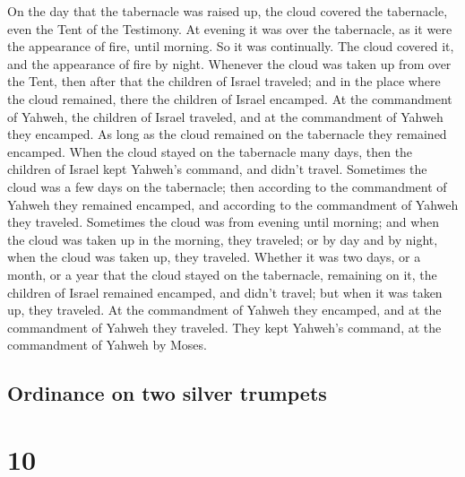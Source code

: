  On the day that the tabernacle was raised up, the cloud
covered the tabernacle, even the Tent of the Testimony. At evening it
was over the tabernacle, as it were the appearance of fire, until
morning.  So it was continually. The cloud covered it,
and the appearance of fire by night.  Whenever the cloud
was taken up from over the Tent, then after that the children of Israel
traveled; and in the place where the cloud remained, there the children
of Israel encamped.  At the commandment of Yahweh, the
children of Israel traveled, and at the commandment of Yahweh they
encamped. As long as the cloud remained on the tabernacle they remained
encamped.  When the cloud stayed on the tabernacle many
days, then the children of Israel kept Yahweh's command, and didn't
travel.  Sometimes the cloud was a few days on the
tabernacle; then according to the commandment of Yahweh they remained
encamped, and according to the commandment of Yahweh they traveled.
 Sometimes the cloud was from evening until morning; and
when the cloud was taken up in the morning, they traveled; or by day and
by night, when the cloud was taken up, they traveled. 
Whether it was two days, or a month, or a year that the cloud stayed on
the tabernacle, remaining on it, the children of Israel remained
encamped, and didn't travel; but when it was taken up, they traveled.
 At the commandment of Yahweh they encamped, and at the
commandment of Yahweh they traveled. They kept Yahweh's command, at the
commandment of Yahweh by Moses.

\hypertarget{ordinance-on-two-silver-trumpets}{%
\subsection{Ordinance on two silver
trumpets}\label{ordinance-on-two-silver-trumpets}}

\hypertarget{section-9}{%
\section{10}\label{section-9}}

